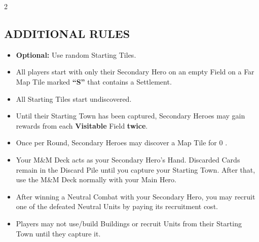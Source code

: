 \begin{multicols}{2}
\columnbreak

\subsection*{\MakeUppercase{Additional Rules}}
\begin{itemize}
  \item \textbf{Optional:} Use random Starting Tiles.
  \item All players start with only their Secondary Hero on an empty Field on a Far Map Tile marked \textbf{``S''} that contains a Settlement.
  \item All Starting Tiles start undiscovered.
  \item Until their Starting Town has been captured, Secondary Heroes may gain rewards from each \textbf{Visitable} Field \textbf{twice}.
  \item Once per Round, Secondary Heroes may discover a Map Tile for 0 .
  \item Your M\&M Deck acts as your Secondary Hero's Hand. Discarded Cards remain in the Discard Pile until you capture your Starting Town. After that, use the M\&M Deck normally with your Main Hero.
  \item After winning a Neutral Combat with your Secondary Hero, you may recruit one of the defeated Neutral Units by paying its recruitment cost.
  \item Players may not use/build Buildings or recruit Units from their Starting Town until they capture it.

\columnbreak


\end{itemize}
\end{multicols}

